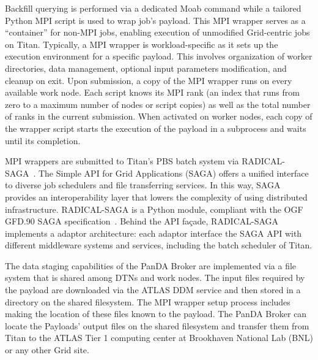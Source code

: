 Backfill querying is performed via a dedicated Moab command while a tailored
Python MPI script is used to wrap job's payload. This MPI wrapper serves as a
``container'' for non-MPI jobs, enabling execution of unmodified Grid-centric
jobs on Titan. Typically, a MPI wrapper is workload-specific as it sets up the
execution environment for a specific payload. This involves organization of
worker directories, data management, optional input parameters modification, and
cleanup on exit. Upon submission, a copy of the MPI wrapper runs on every
available work node. Each script knows its MPI rank (an index that runs from
zero to a maximum number of nodes or script copies) as well as the total number
of ranks in the current submission. When activated on worker nodes, each copy of
the wrapper script starts the execution of the payload in a subprocess and waits
until its completion.

MPI wrappers are submitted to Titan's PBS batch system via
RADICAL-SAGA~\cite{radical-saga}. The Simple API for Grid Applications (SAGA)
offers a unified interface to diverse job schedulers and file transferring
services. In this way, SAGA provides an interoperability layer that lowers the
complexity of using distributed infrastructure. RADICAL-SAGA is a Python module,
compliant with the OGF GFD.90 SAGA specification~\cite{saga-spec}. Behind the
API façade, RADICAL-SAGA implements a adaptor architecture: each adaptor
interface the SAGA API with different middleware systems and services, including
the batch scheduler of Titan.

The data staging capabilities of the PanDA Broker are implemented via a file
system that is shared among DTNs and work nodes. The input files required by the
payload are downloaded via the ATLAS DDM service and then stored in a directory
on the shared filesystem. The MPI wrapper setup process includes making the
location of these files known to the payload. The PanDA Broker can locate the
Payloads' output files on the shared filesystem and transfer them from Titan to
the ATLAS Tier 1 computing center at Brookhaven National Lab (BNL) or any other
Grid site.

